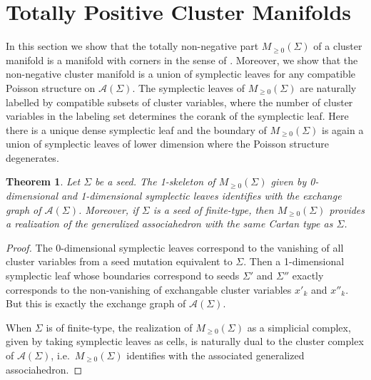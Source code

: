 \documentclass{amsart}
\newtheorem{theorem}{Theorem}[section]
\numberwithin{equation}{section}
\newcommand{\cA}{\mathcal{A}}
\begin{document}
\section{Totally Positive Cluster Manifolds}
In this section we show that the totally non-negative part $M_{\ge0}(\Sigma)$ of a cluster manifold is a manifold with corners in the sense of \cite{Joy12}.  
Moreover, we show that the non-negative cluster manifold is a union of symplectic leaves for any compatible Poisson structure on $\cA(\Sigma)$.  
The symplectic leaves of $M_{\ge0}(\Sigma)$ are naturally labelled by compatible subsets of cluster variables, where the number of cluster variables in the labeling set determines the corank of the symplectic leaf.
Here there is a unique dense symplectic leaf and the boundary of $M_{\ge0}(\Sigma)$ is again a union of symplectic leaves of lower dimension where the Poisson structure degenerates.

\begin{theorem}
  Let $\Sigma$ be a seed.  
  The 1-skeleton of $M_{\ge0}(\Sigma)$ given by 0-dimensional and 1-dimensional symplectic leaves identifies with the exchange graph of $\cA(\Sigma)$.  
  Moreover, if $\Sigma$ is a seed of finite-type, then $M_{\ge0}(\Sigma)$ provides a realization of the generalized associahedron with the same Cartan type as $\Sigma$.
\end{theorem}
\begin{proof}
  The 0-dimensional symplectic leaves correspond to the vanishing of all cluster variables from a seed mutation equivalent to $\Sigma$.  
  Then a 1-dimensional symplectic leaf whose boundaries correspond to seeds $\Sigma'$ and $\Sigma''$ exactly corresponds to the non-vanishing of exchangable cluster variables $x'_k$ and $x''_k$.
  But this is exactly the exchange graph of $\cA(\Sigma)$.

  When $\Sigma$ is of finite-type, the realization of $M_{\ge0}(\Sigma)$ as a simplicial complex, given by taking symplectic leaves as cells, is naturally dual to the cluster complex of $\cA(\Sigma)$, i.e.\ $M_{\ge0}(\Sigma)$ identifies with the associated generalized associahedron.
\end{proof}






\end{document}
